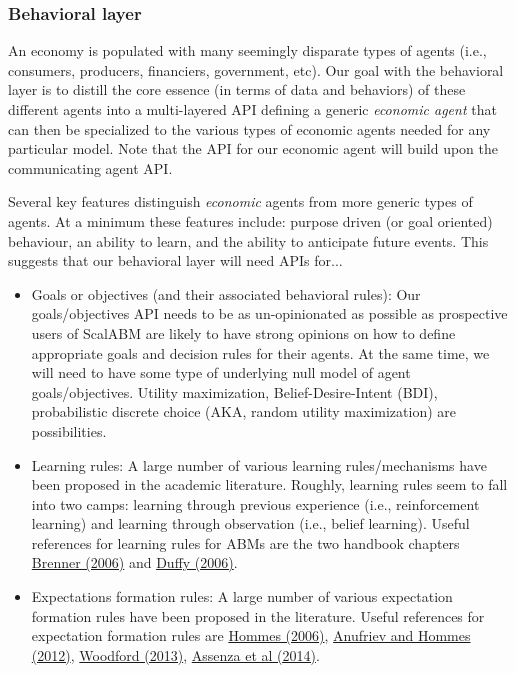 \documentclass[11pt]{amsart}
\begin{document}
\subsubsection{Behavioral layer}
An economy is populated with many seemingly disparate types of agents (i.e., consumers, producers, financiers, government, etc).  Our goal with the behavioral layer is to distill the core essence (in terms of data and behaviors) of these different agents into a multi-layered API defining a generic \textit{economic agent} that can then be specialized to the various types of economic agents needed for any particular model. Note that the API for our economic agent will build upon the communicating agent API.

Several key features distinguish \textit{economic} agents from more generic types of agents. At a minimum these features include: purpose driven (or goal oriented) behaviour, an ability to learn, and the ability to anticipate future events. This suggests that our behavioral layer will need APIs for...
\begin{itemize}
    \item Goals or objectives (and their associated behavioral rules): Our goals/objectives API needs to be as un-opinionated as possible as prospective users of ScalABM are likely to have strong opinions on how to define appropriate goals and decision rules for their agents. At the same time, we will need to have some type of underlying null model of agent goals/objectives. Utility maximization, Belief-Desire-Intent (BDI), probabilistic discrete choice (AKA, random utility maximization) are possibilities.
    \item Learning rules: A large number of various learning rules/mechanisms have been proposed in the academic literature. Roughly, learning rules seem to fall into two camps: learning through previous experience (i.e., reinforcement learning) and learning through observation (i.e., belief learning). Useful references for learning rules for ABMs are the two handbook chapters \href{http://web.uvic.ca/~mingkang/econ353/project/Brenner.pdf}{Brenner (2006)} and \href{http://www.socsci.uci.edu/~duffy/papers/duffy2006.pdf}{Duffy (2006)}.
    \item Expectations formation rules: A large number of various expectation formation rules have been proposed in the literature. Useful references for expectation formation rules are \href{http://feb.kuleuven.be/fac/Slides_Degrauwe/HomHBchapter23.pdf}{Hommes (2006)}, \href{http://econ.columbia.edu/files/econ/content/hommes_background_material_2.pdf}{Anufriev and Hommes (2012)}, \href{http://www.columbia.edu/~mw2230/AREcon.pdf}{Woodford (2013)}, \href{http://www.emeraldinsight.com/doi/pdfplus/10.1108/S0193-230620140000017002}{Assenza et al (2014)}.
\end{itemize}
\end{document}
